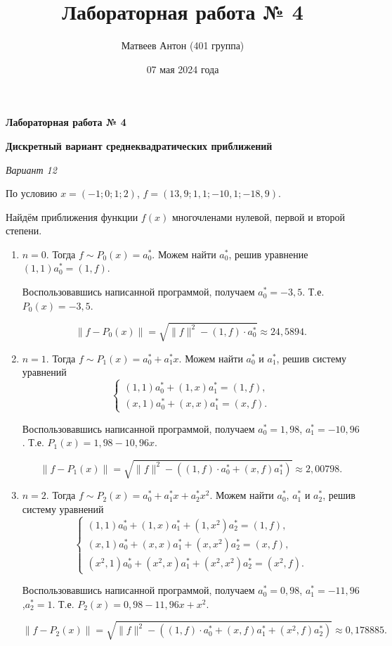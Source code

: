 \documentclass[12pt]{article}
\title{Лабораторная работа № 4}
\author{Матвеев Антон (401 группа)}
\date{07 мая 2024 года}
\begin{document}
	\begin{center}
		\textbf{\large Лабораторная работа № 4}
		
		\textbf{\large Дискретный вариант среднеквадратических приближений}
		
		\textit{Вариант 12}
	\end{center}
	
	По условию $x=(-1; 0; 1; 2)$, $f=(13,9; 1,1; -10,1; -18,9)$.
	
	Найдём приближения функции $f(x)$ многочленами нулевой, первой и второй степени.
	
	\begin{enumerate}[label=\asbuk*), leftmargin=35pt]
		\item $n=0$. Тогда $f\sim P_0(x)=a_0^*$. Можем найти $a_0^*$, решив уравнение $(1, 1)a_0^*=(1, f)$.
		
		Воспользовавшись написанной программой, получаем $a_0^*=-3,5$. Т.е. $P_0(x)=-3,5$.
		
		$$\|f-P_0(x)\|=\sqrt{\|f\|^2-(1, f)\cdot a_0^*}\approx 24,5894.$$
		
		\item $n=1$. Тогда $f\sim P_1(x)=a_0^*+a_1^*x$. Можем найти $a_0^*$ и $a_1^*$, решив систему уравнений
		$$\begin{cases}
			(1, 1)a_0^*+(1, x)a_1^*=(1, f), \\
			(x, 1)a_0^*+(x, x)a_1^*=(x, f).
		\end{cases}$$
		
		Воспользовавшись написанной программой, получаем $a_0^*=1,98$, $a_1^*=-10,96$. Т.е. $P_1(x)=1,98-10,96x$.
		
		$$\|f-P_1(x)\|=\sqrt{\|f\|^2-\left((1, f)\cdot a_0^*+(x, f)a_1^*\right)}\approx 2,00798.$$
		
		\item $n=2$. Тогда $f\sim P_2(x)=a_0^*+a_1^*x+a_2^*x^2$. Можем найти $a_0^*$, $a_1^*$ и $a_2^*$, решив систему уравнений
		$$\begin{cases}
			(1, 1)a_0^*+(1, x)a_1^*+(1, x^2)a_2^*=(1, f), \\
			(x, 1)a_0^*+(x, x)a_1^*+(x, x^2)a_2^*=(x, f), \\
			(x^2, 1)a_0^*+(x^2 , x)a_1^*+(x^2, x^2)a_2^*=(x^2, f).
		\end{cases}$$
		
		Воспользовавшись написанной программой, получаем $a_0^*=0,98$, $a_1^*=-11,96$,\linebreak $a_2^*=1$. Т.е. $P_2(x)=0,98-11,96x+x^2$.
		
		$$\|f-P_2(x)\|=\sqrt{\|f\|^2-\left((1, f)\cdot a_0^*+(x, f)a_1^*+(x^2, f)a_2^*\right)}\approx 0,178885.$$
	\end{enumerate}
	
\end{document}
